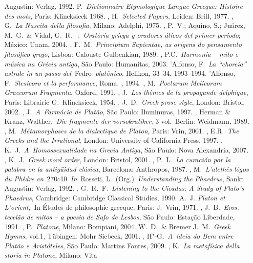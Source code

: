 \begin{bibliohedra}
  Augustin: Verlag, 1992.
 P.~\emph{Dictionnaire Etymologique Langue Grecque: Histoire
  des mots}, Paris: Klincksieck 1968.
, H.~\emph{Selected Papers}, Leiden: Brill, 1977.
, G.~\emph{La Nascita della filosofia}, Milano: Adelphi, 1975.
, P.~V.; Aquino, S.; Juárez, M.~G.~\& Vidal, G.~R.~  ;~\emph{Oratória griega y oradores áticos del primer periodo}; México:
  Unam, 2004.
, F.~M.~\emph{Principium Sapientae, as origens do pensamento
  filosófico grego}, Lisboa: Calouste Gulbenkian, 1989.
, P.C.~\emph{Harmonia -- mito e música na Grécia antiga}, São
  Paulo: Humanitas, 2003.
'Alfonso, F.~\emph{La ``choreía'' astrale in un passo
  del~}Fedro\emph{~platônico}, Helikon, 33--34, 1993--1994.
'Alfonso, F.~\emph{Stesicoro et la performance}, Roma: , 1994.
, M.~\emph{Poetarum Melicorum Graecorum Fragmenta}, Oxford,
  1991.
, J.~\emph{Les thèmes de la propagande delphique}, Paris:
  Librairie G.~Klincksieck, 1954.
, J.~D.~\emph{Greek prose style}, London: Bristol, 2002.
, J.~\emph{A~Farmácia de Platão}, São Paulo: Iluminuras, 1997.
, Herman \& Kranz, Walther.~\emph{Die fragmente der
  vorsokratiker}, 3 vol.~Berlin: Weidmann, 1989.
, M.~\emph{Métamorphoses de la dialectique de Platon}, Paris:
  Vrin, 2001.
, E.R.~\emph{The Greeks and the Irrational}, London: University
  of California Press, 1997.
, K.~J.~\emph{A~Homossexualidade na Grecia Antiga}, São Paulo:
  Nova Alexandria, 2007.
, K.~J.~\emph{Greek word order}, London: Bristol, 2001.
, P.~L.~\emph{La curación por la palabra en la antigüidad
  clásica}, Barcelona: Anthropos, 1987.
, M.~\emph{L'alethès lógos du Phèdre
  en}~270c10~\emph{In}~Rosseti, L.~(Org.)~\emph{Understanding the
  Phaedrus}, Sankt Augustin: Verlag, 1992.
, G.~R.~F.~\emph{Listening to the Cicadas: A Study of Plato's
  Phaedrus}, Cambridge: Cambridge Classical Studies, 1990.
 A.~J\emph{. Platon et L'orient,~}In Études de philosophie
  grecque, Paris: J.~Vrin, 1971.
, J.~B.~\emph{Eros, tecelão de mitos -- a poesia de Safo de
  Lesbos}, São Paulo: Estação Liberdade, 1991.
, P.~\emph{Platone}, Milano: Bompiani, 2004.
 W.~D.~\& Bremer J.~M.~\emph{Greek Hymns}, vol.1, Tübingen: Mohr
  Siebeck, 2001.
, H"-G.~\emph{A~ideia do Bem entre Platão e Aristóteles}, São
  Paulo: Martins Fontes, 2009.
, K.~\emph{La metafísica della storia in Platone}, Milano: Vita

\end{bibliohedra}
